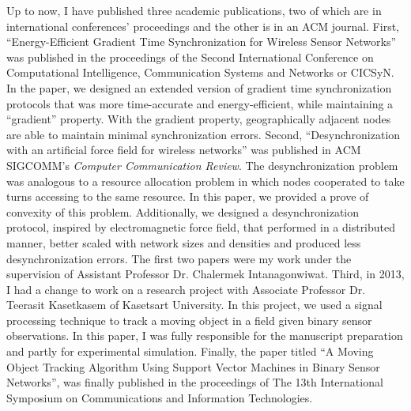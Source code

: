 \documentclass[a4paper,10pt]{report}
\begin{document}
\vspace{0.2cm}
Up to now, I have published three academic publications, two of which are in international conferences' proceedings and the other is in an ACM journal.  First, ``Energy-Efficient Gradient Time Synchronization for Wireless Sensor Networks'' was published in the proceedings of the Second International Conference on Computational Intelligence, Communication Systems and Networks or CICSyN. In the paper, we designed an extended version of gradient time synchronization protocols that was more time-accurate and energy-efficient, while maintaining a ``gradient'' property. With the gradient property, geographically adjacent nodes are able to maintain minimal synchronization errors. Second, ``Desynchronization with an artificial force field for wireless networks'' was published in ACM SIGCOMM's \textit{Computer Communication Review}. The desynchronization problem was analogous to a resource allocation problem in which nodes cooperated to take turns accessing to the same resource. In this paper, we provided a prove of convexity of this problem. Additionally, we designed a desynchronization protocol, inspired by electromagnetic force field, that performed in a distributed manner, better scaled with network sizes and densities and produced less desynchronization errors. The first two papers were my work under the supervision of Assistant Professor Dr. Chalermek Intanagonwiwat. Third, in 2013, I had a change to work on a research project with Associate Professor Dr. Teerasit Kasetkasem of Kasetsart University. In this project, we used a signal processing technique to track a moving object in a field given binary sensor observations. In this paper, I was fully responsible for the manuscript preparation and partly for experimental simulation. Finally, the paper titled ``A Moving Object Tracking Algorithm Using Support Vector Machines in Binary Sensor Networks'', was finally published in the proceedings of The 13th International Symposium on Communications and Information Technologies.
\end{document}
